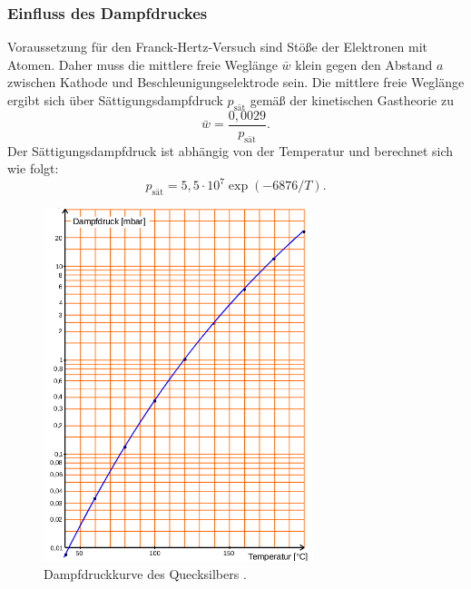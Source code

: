 \subsubsection{Einfluss des Dampfdruckes}
Voraussetzung für den Franck-Hertz-Versuch sind Stöße der Elektronen mit Atomen.
Daher muss die mittlere freie Weglänge $\bar{w}$ klein gegen den Abstand $a$ zwischen Kathode
und Beschleunigungselektrode sein.
Die mittlere freie Weglänge ergibt sich über Sättigungsdampfdruck $p_{\mathrm{sät}}$ gemäß der kinetischen
Gastheorie zu
\begin{equation}
	\label{eqn:freiewegl}
	\bar{w} = \frac{0,0029}{p_{\mathrm{sät}}} \mathrm{.}
\end{equation}
Der Sättigungsdampfdruck ist abhängig von der Temperatur und berechnet sich wie folgt:
\begin{equation}
	\label{eqn:p}
	p_\mathrm{sät}=5,5\cdot10^{7}\exp(-6876/T) \mathrm{.}
\end{equation}
\begin{figure}
  \centering
  \includegraphics[width=0.7\textwidth]{Bilder/dampfdruckkurve.png}
  \caption{Dampfdruckkurve des Quecksilbers \cite{Anleitung}.}
  \label{fig:dampfi}
\end{figure}
